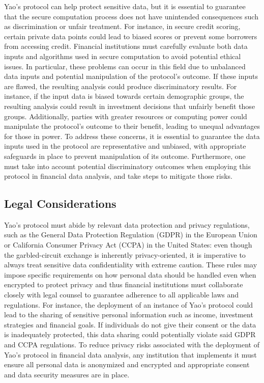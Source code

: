 \documentclass[12pt]{article}
\begin{document}
Yao's protocol can help protect sensitive data, but it is essential to guarantee that the secure computation process does not have unintended consequences such as discrimination or unfair treatment. For instance, in secure credit scoring, certain private data points could lead to biased scores or prevent some borrowers from accessing credit. Financial institutions must carefully evaluate both data inputs and algorithms used in secure computation to avoid potential ethical issues. In particular, these problems can occur in this field due to unbalanced data inputs and potential manipulation of the protocol's outcome. If these inputs are flawed, the resulting analysis could produce discriminatory results. For instance, if the input data is biased towards certain demographic groups, the resulting analysis could result in investment decisions that unfairly benefit those groups. Additionally, parties with greater resources or computing power could manipulate the protocol's outcome to their benefit, leading to unequal advantages for those in power. To address these concerns, it is essential to guarantee the data inputs used in the protocol are representative and unbiased, with appropriate safeguards in place to prevent manipulation of its outcome. Furthermore, one must take into account potential discriminatory outcomes when employing this protocol in financial data analysis, and take steps to mitigate those risks.

\subsection{Legal Considerations}

Yao's protocol must abide by relevant data protection and privacy regulations, such as the General Data Protection Regulation (GDPR) in the European Union or California Consumer Privacy Act (CCPA) in the United States: even though the garbled-circuit exchange is inherently privacy-oriented, it is imperative to always treat sensitive data confidentiality with extreme caution. These rules may impose specific requirements on how personal data should be handled even when encrypted to protect privacy and thus financial institutions must collaborate closely with legal counsel to guarantee adherence to all applicable laws and regulations. For instance, the deployment of an instance of Yao's protocol could lead to the sharing of sensitive personal information such as income, investment strategies and financial goals. If individuals do not give their consent or the data is inadequately protected, this data sharing could potentially violate said GDPR and CCPA regulations. To reduce privacy risks associated with the deployment of Yao's protocol in financial data analysis, any institution that implements it must ensure all personal data is anonymized and encrypted and appropriate consent and data security measures are in place.
\end{document}
